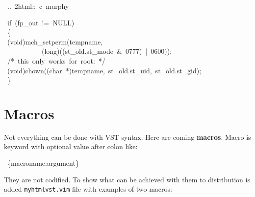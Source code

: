 \documentclass[12pt]{article}
\begin{document}
\begin{ttfamily}\begin{flushleft}
\mbox{~..~2html::~c~murphy}\\
\end{flushleft}\end{ttfamily}

\begin{ttfamily}\begin{flushleft}
\mbox{~if~(fp\_out~!=~NULL)}\\
\mbox{~\{}\\
\mbox{~(void)mch\_setperm(tempname,}\\
\mbox{~~~~~~~~~~~(long)((st\_old.st\_mode~\&~0777)~|~0600));}\\
\mbox{~/*~this~only~works~for~root:~*/}\\
\mbox{~(void)chown((char~*)tempname,~st\_old.st\_uid,~st\_old.st\_gid);}\\
\mbox{~\}}\\
\end{flushleft}\end{ttfamily}

\hypertarget{lmacros}{}
\section{Macros}

Not everything can be done with VST syntax. Here are coming \textbf{macros}. Macro
is keyword with optional value after colon like:

\begin{ttfamily}\begin{flushleft}
\mbox{~\{macroname:argument\}}\\
\end{flushleft}\end{ttfamily}

They are not codified. To show what can be achieved with them to distribution
is added \texttt{myhtmlvst.vim} file with examples of two macros:
\end{document}
